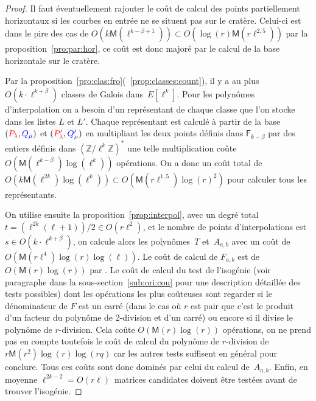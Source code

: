 \documentclass[10pt,a4paper]{book}
\theoremstyle{plain}
\theoremstyle{definition}
\theoremstyle{definition}
\theoremstyle{definition}
\theoremstyle{definition}
\theoremstyle{remark}
\theoremstyle{remark}
\theoremstyle{definition}
\begin{document}
\begin{proof}
  Il faut éventuellement rajouter le coût de calcul des points partiellement 
  horizontaux si les courbes en entrée ne se situent pas sur le cratère. 
  Celui-ci est dans le pire des cas de
  $O(k\mathsf{M}(\ell^{k-\beta+1})) \subset O(\log(r) \mathsf{M}(r \ell^{2,5}) )$ par la proposition~\ref{pro:par:hor}, ce 
  coût est donc majoré par le calcul de la base horizontale sur le cratère.

  Par la proposition~\ref{pro:clas:fro}(~\ref{prop:classes:count}), il y a au 
  plus~$O(k \cdot \ell^{k+\beta})$ classes de Galois dans~$E[\ell^k]$. 
  Pour les polynômes d'interpolation on a besoin d'un représentant de chaque 
  classe que l'on stocke dans les listes $L$ et $L'$. Chaque représentant est
  calculé à partir de la base $(\color{red}P_{\lambda}\color{black},
  \color{blue}Q_{\mu}\color{black})$ et $(\color{red}P'_{\lambda}\color{black},
  \color{blue}Q'_{\mu}\color{black})$ en multipliant les deux points définis 
  dans $\mathsf{F}_{k-\beta}$ par des entiers définis dans 
  $\left( \mathbb{Z}/\ell^{k}\mathbb{Z}\right)^*$ une telle multiplication coûte 
  $O(\mathsf{M}(\ell^{k-\beta})\log(\ell^k))$ opérations. On a donc un coût total de 
  $O(k\mathsf{M}(\ell^{2k})\log(\ell^k)) \subset O(\mathsf{M}(r\ell^{1,5})\log(r)^2)$
  pour calculer tous les représentants.
  
  
  On utilise ensuite la proposition~\ref{prop:interpol}, avec un degré total
  ~$t = (\ell^{2k}(\ell+1))/2\in O(r\ell^2)$, et le nombre de points d'interpolations
  est $s \in O(k \cdot \ell^{k+\beta})$, on calcule alors les polynômes~$T$
  et~$A_{a,b}$ avec un coût de~$O(\mathsf{M}(r \ell^4)\log(r)\log(\ell))$.  Le coût
  de calcul de $F_{a,b}$ est de $O(\mathsf{M}(r)\log(r))$ par 
  \cite[Théorème 7.5]{algeff17}. Le coût de calcul du test de l'isogénie (voir
  paragraphe dans la sous-section~\ref{sub:ori:cou} pour une description 
  détaillée des tests possibles) dont les opérations 
  les plus coûteuses sont regarder si le dénominateur de $F$ est un carré (dans
  le cas où $r$ est pair que c’est le produit d’un facteur du polynôme de 
  2-division et d’un carré) ou 
  encore si il divise le polynôme de $r$-division. Cela coûte $O(\mathsf{M}(r)
  \log(r))$ opérations, on ne prend pas en compte toutefois le coût de calcul
   du polynôme de $r$-division  de $r\mathsf{M}(r^2)\log(r)\log(r q)$ car 
  les autres tests suffisent en général pour conclure. Tous ces coûts sont donc
  dominés par celui du calcul de~$A_{a,b}$.  Enfin, en moyenne 
   ${\ell^{2k-2}=O(r\ell)}$~matrices candidates doivent être testées
   avant de trouver l'isogénie.
\end{proof}
 
\end{document}
